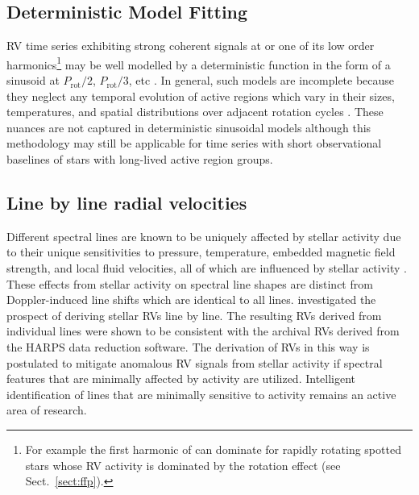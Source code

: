 \subsection{Deterministic Model Fitting}
RV time series exhibiting strong coherent signals at \prot{} or one of its low order
harmonics\footnote{For example the first harmonic of \prot{} can dominate for rapidly rotating
  spotted stars whose RV activity
  is dominated by the rotation effect (see Sect.~\ref{sect:ffp}).} may be well modelled by
a deterministic function in the form of a sinusoid at \prot{,} $P_{\text{rot}}/2$, $P_{\text{rot}}/3$,
etc \citep{boisse11}. In general, such models are incomplete because they neglect any temporal
evolution of active regions which vary in their sizes, temperatures, and spatial distributions
over adjacent rotation cycles \citep{giles17}. These nuances are not captured in 
deterministic sinusoidal models although this methodology may still be applicable for time series
with short observational baselines of stars with long-lived active region groups.



\subsection{Line by line radial velocities}
Different spectral lines are known to be uniquely affected by stellar activity due to their
unique sensitivities to pressure, temperature, embedded magnetic field strength, and local fluid
velocities, all of which are influenced by stellar activity \citep{davis17,wise18}. These
effects from stellar activity on spectral line shapes are distinct from Doppler-induced
line shifts which are identical to all lines. \cite{dumusque18} investigated
the prospect of deriving stellar RVs line by line. The resulting RVs derived from
individual lines were shown to be
consistent with the archival RVs derived from the HARPS data reduction software.
The derivation of RVs in this way is postulated to mitigate anomalous RV signals
from stellar activity if spectral features that are minimally affected by activity
are utilized. Intelligent identification of lines that are minimally sensitive to
activity remains an active area of research. \\

